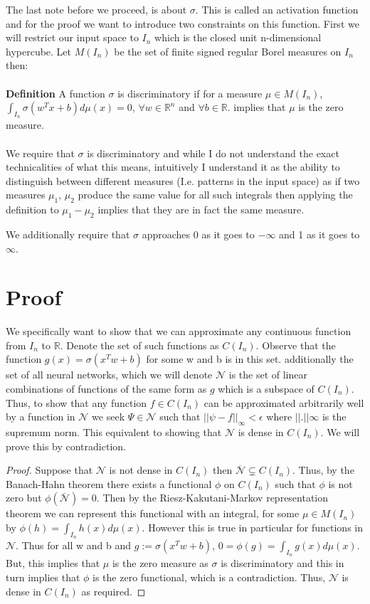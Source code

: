 \documentclass[12pt]{article}
\begin{document}
The last note before we proceed, is about $\sigma$. This is called an activation function and
for the proof we want to introduce two constraints on this function. First we will restrict
our input space to $I_n$ which is the closed unit n-dimensional hypercube. Let $M(I_n)$ be the set
of finite signed regular Borel measures on $I_n$ then:
\\ \\
\textbf{Definition} A function $\sigma$ is discriminatory if for a measure $\mu \in M(I_n)$,
$\int_{I_n}\sigma(w^Tx + b)d\mu(x) = 0$, $\forall w \in \mathbb{R}^n$ and $\forall b \in \mathbb{R}$.
implies that $\mu$ is the zero measure.
\\ \\

We require that $\sigma$ is discriminatory and while I do not understand the exact technicalities
of what this means, intuitively I understand it as the ability to distinguish between different
measures (I.e. patterns in the input space) as if two measures $\mu_1$, $\mu_2$ produce the same value for all such integrals
then applying the definition to $\mu_1 - \mu_2$ implies that they are in fact the same measure.


We additionally require that $\sigma$ approaches 0 as it goes to $-\infty$ and 1
as it goes to $\infty$.

\section*{Proof}
We specifically want to show that we can approximate any continuous function
from $I_n$ to $\mathbb{R}$. Denote the set of such functions as $C(I_n)$. Observe that
the function $g(x) = \sigma(x^Tw + b)$ for some w and b is in this set. additionally
the set of all neural networks, which we will denote $\mathcal{N}$ is the set of linear combinations of
functions of the same form as $g$ which is a subspace of $C(I_n)$. Thus, to show that any function $f \in C(I_n)$ can be approximated
arbitrarily well by a function in $\mathcal{N}$ we seek $\Psi \in \mathcal{N}$ such that
$||\psi - f||_\infty < \epsilon$ where $|| . ||\infty$ is the supremum norm. This equivalent to showing that
$\mathcal{N}$ is dense in $C(I_n)$. We will prove this by contradiction.
\begin{proof}
    Suppose that $\mathcal{N}$ is not dense in $C(I_n)$ then $\overline{\mathcal{N}} \subsetneq C(I_n)$. Thus,
    by the Banach-Hahn theorem there exists a functional $\phi$ on $C(I_n)$ such that
    $\phi$ is not zero but $\phi(\overline{\mathcal{N}}) = 0$. Then by the Riesz-Kakutani-Markov
    representation theorem we can represent this functional with an integral, for some $\mu \in M(I_n)$
    by $\phi(h) = \int_{I_n}h(x)d\mu(x)$. However this is true in particular for functions
    in $\mathcal{N}$. Thus for all w and b and $g := \sigma(x^Tw + b)$, $0 = \phi(g) = \int_{I_n}g(x)d\mu(x)$.
    But, this implies that $\mu$ is the zero measure as $\sigma$ is discriminatory and this in turn
    implies that $\phi$ is the zero functional, which is a contradiction. Thus, $\mathcal{N}$ is dense
    in $C(I_n)$ as required.
\end{proof}
\end{document}
